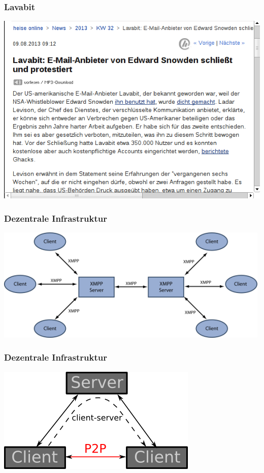 \documentclass[12pt]{beamer}
\begin{document}
\begin{frame}
    \frametitle{Lavabit}
    \includegraphics[height=0.6\textheight]{img/heise_lavabit.png}
\end{frame}

\begin{frame}
    \frametitle{Dezentrale Infrastruktur}
    \includegraphics[height=0.5\textheight]{img/xmpp1.png}
\end{frame}

\begin{frame}
    \frametitle{Dezentrale Infrastruktur}
    \includegraphics[height=0.5\textheight]{img/client-server-graph.png}
\end{frame}
\end{document}
